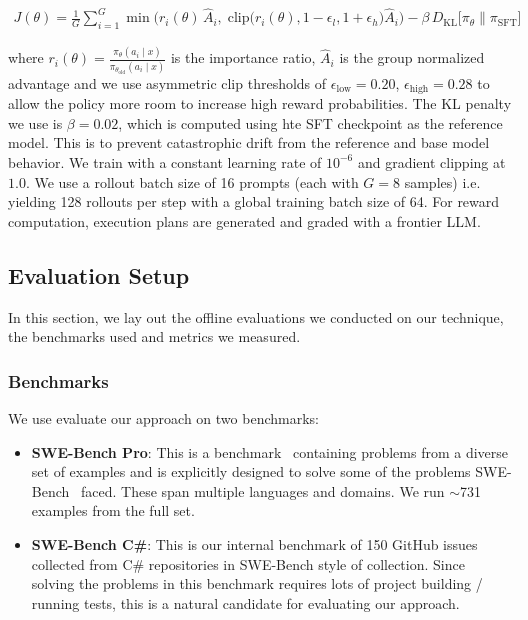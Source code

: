 \documentclass[sigconf,review]{acmart}
\begin{document}
{\fontsize{6.8pt}{10pt}\selectfont
\begin{equation}
\begin{split}
   J(\theta) = \frac{1}{G} \sum_{i=1}^{G}
   \min\!\Big(
     r_i(\theta)\,\hat{A}_i,\; \text{clip}\big(r_i(\theta),
       1{-}\epsilon_l,
       1{+}\epsilon_h\big)\hat{A}_i
   \Big) - \beta\, D_{\text{KL}}\!\big[\pi_\theta \| \pi_{\text{SFT}}\big]
   \end{split}
\end{equation}
}

\noindent where $r_i(\theta) = \frac{\pi_\theta(a_i \mid x)}{\pi_{\theta_{\text{old}}}(a_i \mid x)}$ is the importance ratio, $\hat{A}_i$ is the group normalized advantage and we use asymmetric clip thresholds of $\epsilon_{\text{low}} = 0.20$, $\epsilon_{\text{high}} = 0.28$ to allow the policy more room to increase high reward probabilities. The KL penalty we use is $\beta=0.02$, which is computed using hte SFT checkpoint as the reference model. This is to prevent catastrophic drift from the reference and base model behavior. We train with a constant learning rate of $10^{-6}$ and gradient clipping at $1.0$. We use a rollout batch size of 16 prompts (each with $G{=}8$ samples) i.e. yielding 128 rollouts per step with a global training batch size of 64. For reward computation, execution plans are generated and graded with a frontier LLM.

\subsection{Evaluation Setup}
In this section, we lay out the offline evaluations we conducted on our technique, the benchmarks used and metrics we measured.
\subsubsection{Benchmarks}
We use evaluate our approach on two benchmarks:
\begin{itemize}
    \item \textbf{SWE-Bench Pro}: This is a benchmark~\cite{swepro} containing problems from a diverse set of examples and is explicitly designed to solve some of the problems SWE-Bench~\cite{swebenchverified} faced. These span multiple languages and domains. We run $\sim$731 examples from the full set.
    \item \textbf{SWE-Bench C\#}: This is our internal benchmark of 150 GitHub issues collected from C\# repositories in SWE-Bench style of collection. Since solving the problems in this benchmark requires lots of project building / running tests, this is a natural candidate for evaluating our approach.
\end{itemize}
\end{document}
